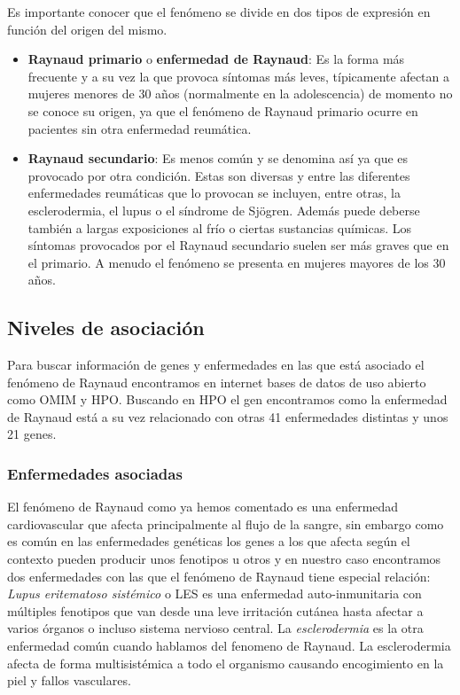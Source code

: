 Es importante conocer que el fenómeno se divide en dos tipos de expresión en función del origen del mismo.
\begin{itemize}
	\item \textbf{Raynaud primario} o \textbf{enfermedad de Raynaud}: Es la forma más frecuente y a su vez la que provoca síntomas más leves, típicamente afectan a mujeres menores de 30 años (normalmente en la adolescencia) de momento no se conoce su origen, ya que el fenómeno de Raynaud primario ocurre en pacientes sin otra enfermedad reumática. \cite{PaulSufka2019ElRaynaud}
	
	\item \textbf{Raynaud secundario}: Es menos común y se denomina así ya que es provocado por otra condición. Estas son diversas y entre las diferentes enfermedades reumáticas que lo provocan se incluyen, entre otras, la esclerodermia, el lupus o el síndrome de Sjögren. Además puede deberse también a largas exposiciones al frío o ciertas sustancias químicas. Los síntomas provocados por el Raynaud secundario suelen ser más graves que en el primario. A menudo el fenómeno se presenta en mujeres mayores de los 30 años. \cite{Pauling2019RaynaudsManagement}
\end{itemize}

\subsection{Niveles de asociación}

Para buscar información de genes y enfermedades en las que está asociado el fenómeno de Raynaud encontramos en internet bases de datos de uso abierto como OMIM y HPO. Buscando en HPO el gen encontramos como la enfermedad de Raynaud está a su vez relacionado con otras 41 enfermedades distintas y unos 21 genes.

\subsubsection{Enfermedades asociadas}

El fenómeno de Raynaud como ya hemos comentado es una enfermedad cardiovascular que afecta principalmente al flujo de la sangre, sin embargo como es común en las enfermedades genéticas los genes a los que afecta según el contexto pueden producir unos fenotipos u otros y en nuestro caso encontramos dos enfermedades con las que el fenómeno de Raynaud tiene especial relación: \textit{Lupus eritematoso sistémico} \cite{Kuhn2022SystemicErythematosus} o LES es una enfermedad auto-inmunitaria con múltiples fenotipos que van desde una leve irritación cutánea hasta afectar a varios órganos o incluso sistema nervioso central. La \textit{esclerodermia} \cite{Mohameden2022SclerodermaDisease} es la otra enfermedad común cuando hablamos del fenomeno de Raynaud. La esclerodermia afecta de forma multisistémica a todo el organismo causando encogimiento en la piel y fallos vasculares.
	
